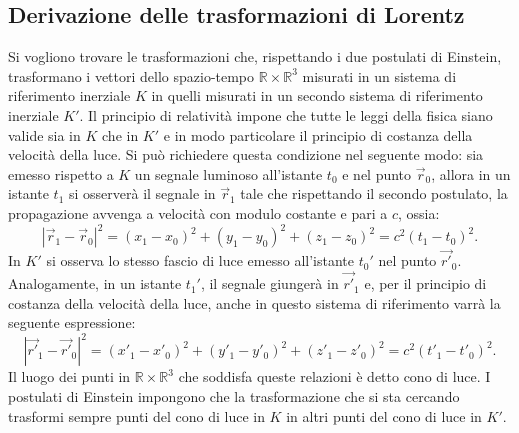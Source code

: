 \subsection{Derivazione delle trasformazioni di Lorentz}
\label{sec:DervTrasfLorentz}
Si vogliono trovare le trasformazioni che, rispettando i due postulati di Einstein, trasformano i vettori dello spazio-tempo $\mathbb{R}\times\mathbb{R}^3$  misurati in un sistema di riferimento inerziale $K$ in quelli misurati in un secondo sistema di riferimento inerziale $K'$. Il principio di relatività impone che tutte le leggi della fisica siano valide sia in $K$ che in $K'$ e in modo particolare il principio di costanza della velocità della luce. Si può richiedere questa condizione nel seguente modo: sia emesso rispetto a $K$ un segnale luminoso all'istante $t_0$ e nel punto $\vec{r}_0$, allora in un istante $t_1$ si osserverà il segnale in $\vec{r}_1$ tale che rispettando il secondo postulato, la propagazione avvenga a velocità con modulo costante e pari a $c$, ossia:
\begin{equation}
    |\vec{r}_1-\vec{r}_0|^2=(x_1-x_0)^2+(y_1-y_0)^2+(z_1-z_0)^2=c^2(t_1-t_0)^2.
    \label{luceK}
\end{equation}
In $K'$ si osserva lo stesso fascio di luce emesso all'istante $t_0'$ nel punto $\vec{r'}_0$. Analogamente, in un istante $t_1'$, il segnale giungerà in $\vec{r'}_1$ e, per il principio di costanza della velocità della luce, anche in questo sistema di riferimento varrà la seguente espressione:
\begin{equation}
    |\vec{r'}_1-\vec{r'}_0|^2=(x'_1-x'_0)^2+(y'_1-y'_0)^2+(z'_1-z'_0)^2=c^2(t'_1-t'_0)^2.
    \label{luceK'}
\end{equation}
Il luogo dei punti in $\mathbb{R}\times\mathbb{R}^3$ che soddisfa queste relazioni è detto cono di luce. I postulati di Einstein impongono che la trasformazione che si sta cercando trasformi sempre punti del cono di luce in $K$ in altri punti del cono di luce in $K'$.\\ 

